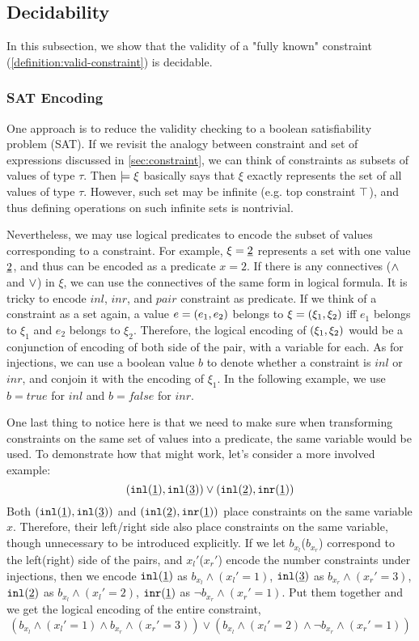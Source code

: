 \subsection{Decidability}
\label{sec:decidability}
In this subsection, we show that the validity of a "fully known" constraint (\autoref{definition:valid-constraint}) is decidable.

\subsubsection{SAT Encoding}
 One approach is to reduce the validity checking to a boolean satisfiability problem (SAT). 
If we revisit the analogy between constraint and set of expressions discussed in \autoref{sec:constraint}, we can think of constraints as subsets of values of type $\tau$.
Then $\models \xi$ basically says that $\xi$ exactly represents the set of all values of type $\tau$. 
However, such set may be infinite (e.g. top constraint $\top$),
and thus defining operations on such infinite sets is nontrivial. 

Nevertheless, we may use logical predicates to encode the subset of values corresponding to a constraint. 
For example, $\xi=\underline{2}$ represents a set with one value $\underline{2}$, and thus can be encoded as a predicate $x=2$. 
If there is any connectives ($\wedge$ and $\vee$) in $\xi$, we can use the connectives of the same form in logical formula. 
It is tricky to encode $inl$, $inr$, and $pair$ constraint as predicate. 
If we think of a constraint as a set again, a value $e=(e_1 , e_2)$ belongs to $\xi=(\xi_1 , \xi_2)$ iff $e_1$ belongs to $\xi_1$ and $e_2$ belongs to $\xi_2$. 
Therefore, the logical encoding of $(\xi_1 , \xi_2)$ would be a conjunction of encoding of both side of the pair, with a variable for each.
As for injections, we can use a boolean value $b$ to denote whether a constraint is $inl$ or $inr$, and conjoin it with the encoding of $\xi_1$. In the following example, we use $b=true$ for $inl$ and $b=false$ for $inr$.

One last thing to notice here is that we need to make sure when transforming constraints on the same set of values into a predicate, the same variable would be used. To demonstrate how that might work, let's consider a more involved example:
\[ (\mathtt{inl}(\underline{1}) , \mathtt{inl}(\underline{3})) \vee (\mathtt{inl}(\underline{2}) , \mathtt{inr}(\underline{1})) \]
Both $(\mathtt{inl}(\underline{1}) , \mathtt{inl}(\underline{3}))$ and $(\mathtt{inl}(\underline{2}) , \mathtt{inr}(\underline{1}))$ place constraints on the same variable $x$.
Therefore, their left/right side also place constraints on the same variable, though unnecessary to be introduced explicitly.
If we let $b_{x_l}$($b_{x_r}$) correspond to the left(right) side of the pairs, and $x_l'$($x_r'$) encode the number constraints under injections, 
then 
we encode $\mathtt{inl}(\underline{1})$ as $b_{x_l} \wedge (x_l'=1)$, 
$\mathtt{inl}(\underline{3})$ as $b_{x_r} \wedge (x_r'=3)$,
$\mathtt{inl}(\underline{2})$ as $b_{x_l} \wedge (x_l'=2)$,
$\mathtt{inr}(\underline{1})$ as $\neg b_{x_r} \wedge (x_r'=1)$. 
Put them together and we get the logical encoding of the entire constraint, 
\[
(b_{x_l} \wedge (x_l'=1) \wedge
b_{x_r} \wedge (x_r'=3))
\vee
(b_{x_l} \wedge (x_l'=2) \wedge
\neg b_{x_r} \wedge (x_r'=1))
\]

